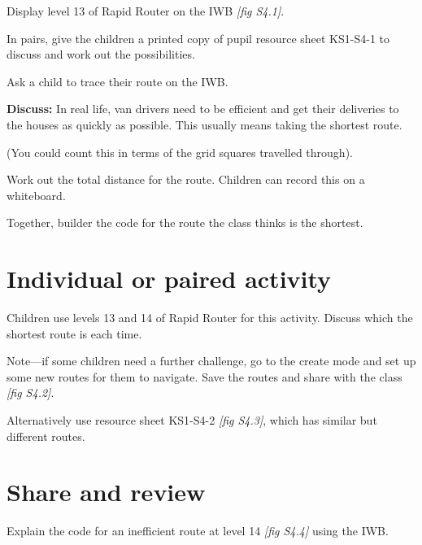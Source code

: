 \documentclass{../../../lessonplan}
\begin{document}
\begin{lessonplan}

Display level 13 of Rapid Router on the IWB \textit{[fig S4.1]}.


In pairs, give the children a printed copy of pupil resource sheet KS1-S4-1 to discuss and work out the possibilities.

Ask a child to trace their route on the IWB.

\textbf{Discuss:} In real life, van drivers need to be efficient and get their deliveries to the houses as quickly as possible.
This usually means taking the shortest route.


(You could count this in terms of the grid squares travelled through).

Work out the total distance for the route.
Children can record this on a whiteboard.


Together, builder the code for the route the class thinks is the shortest.

\section*{Individual or paired activity}

Children use levels 13 and 14 of Rapid Router for this activity.
Discuss which the shortest route is each time.

Note---if some children need a further challenge, go to the create mode and set up some new routes for them to navigate.
Save the routes and share with the class \textit{[fig S4.2]}.


Alternatively use resource sheet KS1-S4-2 \textit{[fig S4.3]}, which has similar but different routes.


\section*{Share and review}

Explain the code for an inefficient route at level 14 \textit{[fig S4.4]} using the IWB.


\end{lessonplan}
\end{document}
